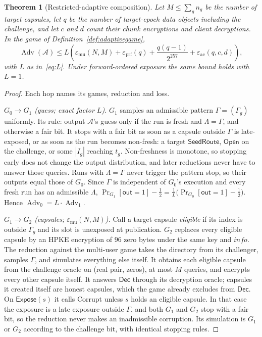 \documentclass[pdflatex,sn-mathphys-num]{sn-jnl}
\theoremstyle{plain}
\newtheorem{theorem}{Theorem}
\theoremstyle{definition}
\newcommand{\Adv}{\operatorname{Adv}}
\begin{document}
\begin{theorem}[Restricted-adaptive composition]\label{thm:adaptive}
Let $M\le\sum_gn_g$ be the number of target capsules, let $q$ be the number of target-epoch data objects including the challenge, and let $c$ and $d$ count their chunk encryptions and client decryptions. In the game of Definition~\ref{def:adaptivegame},
\[
 \Adv(\mathcal A)\le L\left(\varepsilon_{\mathrm{mu}}(N,M)+\varepsilon_{\mathrm{prf}}(q)+\frac{q(q-1)}{2^{257}}+\varepsilon_{\mathrm{ae}}(q,c,d)\right),
\]
with $L$ as in~\eqref{eq:L}. Under forward-ordered exposure the same bound holds with $L=1$.
\end{theorem}
\begin{proof}
Each hop names its games, reduction and loss.

\emph{$G_0\to G_1$ (guess; exact factor $L$).} $G_1$ samples an admissible pattern $\Gamma=(\Gamma_g)$ uniformly. Its rule: output $\mathcal A$'s guess only if the run is fresh and $\Lambda=\Gamma$, and otherwise a fair bit. It stops with a fair bit as soon as a capsule outside $\Gamma$ is late-exposed, or as soon as the run becomes non-fresh: a target $\mathsf{SeedRoute}$, $\mathsf{Open}$ on the challenge, or some $|I_g|$ reaching $t_g$. Non-freshness is monotone, so stopping early does not change the output distribution, and later reductions never have to answer those queries. Runs with $\Lambda=\Gamma$ never trigger the pattern stop, so their outputs equal those of $G_0$. Since $\Gamma$ is independent of $G_0$'s execution and every fresh run has an admissible $\Lambda$, $\Pr_{G_1}[\mathsf{out}=1]-\tfrac12=\tfrac1L\big(\Pr_{G_0}[\mathsf{out}=1]-\tfrac12\big)$. Hence $\Adv_0=L\cdot\Adv_1$.

\emph{$G_1\to G_2$ (capsules; $\varepsilon_{\mathrm{mu}}(N,M)$).} Call a target capsule \emph{eligible} if its index is outside $\Gamma_g$ and its slot is unexposed at publication. $G_2$ replaces every eligible capsule by an HPKE encryption of 96 zero bytes under the same key and $\mathit{info}$. The reduction against the multi-user game takes the directory from its challenger, samples $\Gamma$, and simulates everything else itself. It obtains each eligible capsule from the challenge oracle on (real pair, zeros), at most $M$ queries, and encrypts every other capsule itself. It answers $\mathsf{Dec}$ through its decryption oracle; capsules it created itself are honest capsules, which the game already excludes from $\mathsf{Dec}$. On $\mathsf{Expose}(s)$ it calls Corrupt unless $s$ holds an eligible capsule. In that case the exposure is a late exposure outside $\Gamma$, and both $G_1$ and $G_2$ stop with a fair bit, so the reduction never makes an inadmissible corruption. Its simulation is $G_1$ or $G_2$ according to the challenge bit, with identical stopping rules.


\end{proof}
\end{document}
